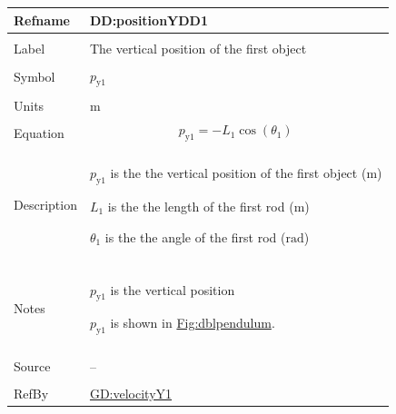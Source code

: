 \documentclass[12pt]{article}
\begin{document}
\vspace{\baselineskip}
\noindent
\begin{minipage}{\textwidth}
\begin{tabular}{>{\raggedright}p{}>{\raggedright\arraybackslash}p{}}
\toprule \textbf{Refname} & \textbf{DD:positionYDD1}
\label{DD:positionYDD1}
\\ \midrule \\
Label & The vertical position of the first object
        
\\ \midrule \\
Symbol & ${p_{\text{y}1}}$
         
\\ \midrule \\
Units & ${\text{m}}$
        
\\ \midrule \\
Equation & \begin{displaymath}
           {p_{\text{y}1}}=-{L_{1}} \cos\left({θ_{1}}\right)
           \end{displaymath}
\\ \midrule \\
Description & \begin{symbDescription}
              \item{${p_{\text{y}1}}$ is the the vertical position of the first object (${\text{m}}$)}
              \item{${L_{1}}$ is the the length of the first rod (${\text{m}}$)}
              \item{${θ_{1}}$ is the the angle of the first rod (${\text{rad}}$)}
              \end{symbDescription}
\\ \midrule \\
Notes & ${p_{\text{y}1}}$ is the vertical position
        
        ${p_{\text{y}1}}$ is shown in \hyperref[Figure:dblpendulum]{Fig:dblpendulum}.
        
\\ \midrule \\
Source & --
         
\\ \midrule \\
RefBy & \hyperref[GD:velocityY1]{GD:velocityY1}
        
\\ \bottomrule
\end{tabular}
\end{minipage}
\end{document}
